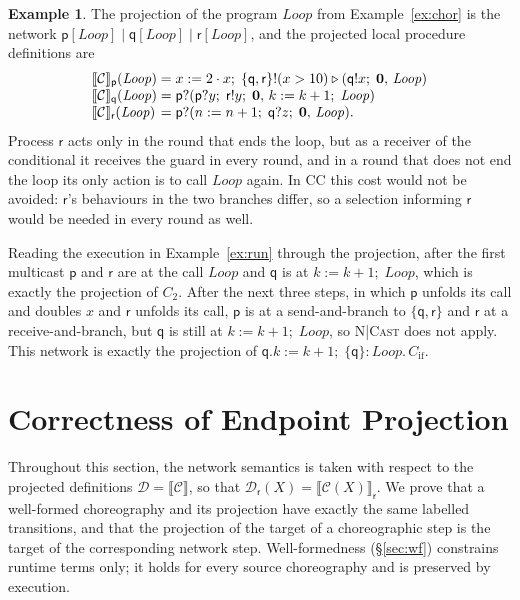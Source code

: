 \documentclass[11pt]{article}
\theoremstyle{plain}
\theoremstyle{definition}
\newtheorem{example}[theorem]{Example}
\theoremstyle{remark}
\newcommand{\nil}{\mathbf{0}}
\newcommand{\seq}{;\;}
\newcommand{\pp}{\mathsf{p}}
\newcommand{\qq}{\mathsf{q}}
\newcommand{\rr}{\mathsf{r}}
\newcommand{\proj}[2]{\llbracket #1 \rrbracket_{#2}}
\newcommand{\projn}[1]{\llbracket #1 \rrbracket}
\newcommand{\rn}[1]{{\normalfont\scshape #1}}
\newcommand{\sendbr}[4]{#1!#2 \mathbin{\triangleright} (#3,\, #4)}
\newcommand{\recvbr}[3]{#1?(#2,\, #3)}
\newcommand{\Defs}{\mathcal{C}}
\newcommand{\NDefs}{\mathcal{D}}
\newcommand{\body}[1]{\Defs(#1)}
\newcommand{\ldef}[2]{\NDefs_{#1}(#2)}
\newcommand{\rt}[3]{#1\mathbin{:}#2.\,#3}
\newcommand{\Loop}{\mathit{Loop}}
\newcommand{\Cif}{C_{\mathrm{if}}}
\begin{document}
\begin{example}\label{ex:epp}
  The projection of the program $\Loop$ from Example~\ref{ex:chor} is the
  network $\pp[\Loop] \mid \qq[\Loop] \mid \rr[\Loop]$, and the projected
  local procedure definitions are
  \[
  \begin{array}{l@{\;=\;}l}
    \projn{\Defs}_\pp(\Loop) & x := 2\cdot x \seq \sendbr{\{\qq,\rr\}}{(x > 10)}{\qq!x \seq \nil}{\Loop}\\
    \projn{\Defs}_\qq(\Loop) & \recvbr{\pp}{\pp?y \seq \rr!y \seq \nil}{k := k+1 \seq \Loop}\\
    \projn{\Defs}_\rr(\Loop) & \recvbr{\pp}{n := n+1 \seq \qq?z \seq \nil}{\Loop}.
  \end{array}
  \]
  Process $\rr$ acts only in the round that ends the loop, but as a receiver
  of the conditional it receives the guard in every round, and in a round
  that does not end the loop its only action is to call $\Loop$ again.  In CC
  this cost would not be avoided: $\rr$'s behaviours in the two branches
  differ, so a selection informing $\rr$ would be needed in every round as
  well.

  Reading the execution in Example~\ref{ex:run} through the projection,
  after the first multicast $\pp$ and $\rr$ are at the call $\Loop$ and $\qq$
  is at $k := k+1 \seq \Loop$, which is exactly the projection of $C_2$.
  After the next three steps, in which $\pp$ unfolds its call and doubles $x$
  and $\rr$ unfolds its call, $\pp$ is at a send-and-branch to $\{\qq,\rr\}$
  and $\rr$ at a receive-and-branch, but $\qq$ is still at
  $k := k+1 \seq \Loop$, so \rn{N|Cast} does not apply.  This network is
  exactly the projection of
  $\qq.k := k+1 \seq \rt{\{\qq\}}{\Loop}{\Cif}$.
\end{example}

\section{Correctness of Endpoint Projection}
\label{sec:correct}

Throughout this section, the network semantics is taken with respect to the
projected definitions $\NDefs = \projn{\Defs}$, so that
$\ldef{\rr}{X} = \proj{\body{X}}{\rr}$.  We prove that a well-formed
choreography and its projection have exactly the same labelled transitions,
and that the projection of the target of a choreographic step is the target
of the corresponding network step.  Well-formedness
(\S\ref{sec:wf}) constrains runtime terms only; it holds for every source
choreography and is preserved by execution.
\end{document}
